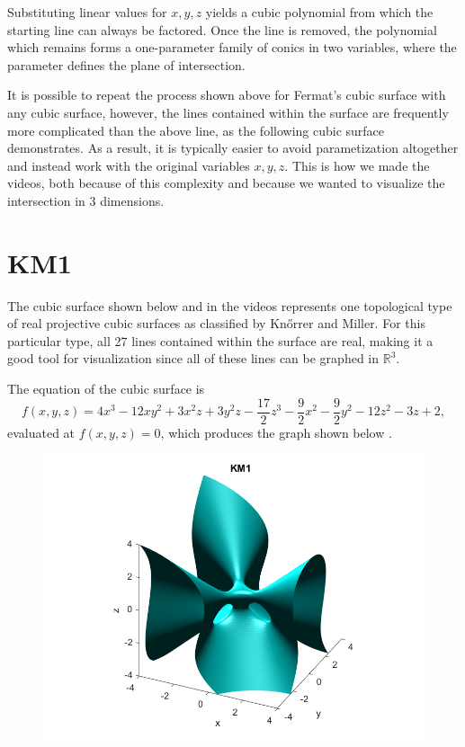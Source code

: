 \documentclass{article}
\newcommand{\R}{{\mathbb R}}
\begin{document}
	Substituting linear values for $x,y,z$ yields a cubic polynomial from which the starting line can always be factored. Once the line is removed, the polynomial which remains forms a one-parameter family of conics in two variables, where the parameter defines the plane of intersection. 
	
	It is possible to repeat the process shown above for Fermat's cubic surface with any cubic surface, however, the lines contained within the surface are frequently more complicated than the above line, as the following cubic surface demonstrates. As a result, it is typically easier to avoid parametization altogether and instead work with the original variables $x, y, z$. This is how we made the videos, both because of this complexity and because we wanted to visualize the intersection in 3 dimensions. 
\fi
	
\newpage
\section{KM1}
	
		The cubic surface shown below and in the videos represents one topological type of real projective cubic surfaces as classified by Kn{\H o}rrer and Miller. For this particular type, all 27 lines contained within the surface are real, making it a good tool for visualization since all of these lines can be graphed in $\R^3$.
	
	The equation of the cubic surface is 
	\[ f(x,y,z) = 4x^3-12xy^2+3x^2z+3y^2z-\frac{17}{2}z^3-\frac{9}{2}x^2-\frac{9}{2}y^2-12z^2-3z+2 \label{km1_eqn}, \]
	evaluated at $f(x,y,z) = 0$, which produces the graph shown below \cite{km_surf}.
	
	\begin{figure}[h!]
		\includegraphics[scale=0.50]{km1_img.png}
		\centering
		\label{km1_fig}
	\end{figure}
	
\end{document}
